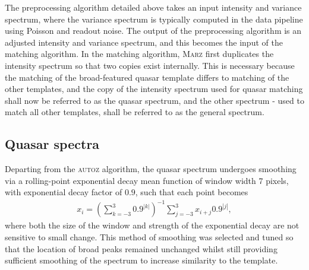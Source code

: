 \documentclass[iop]{emulateapj}
\newcommand{\autoz}{\textsc{autoz}}
\newcommand{\marz}{\textsc{Marz}}
\begin{document}
The preprocessing algorithm detailed above takes an input intensity and variance spectrum, where the variance spectrum is typically computed in the data pipeline using Poisson and readout noise. The output of the preprocessing algorithm is an adjusted intensity and variance spectrum, and this becomes the input of the matching algorithm. In the matching algorithm, \marz{} first duplicates the intensity spectrum so that two copies exist internally. This is necessary because the matching of the broad-featured quasar template differs to matching of the other templates, and the copy of the intensity spectrum used for quasar matching shall now be referred to as the quasar spectrum, and the other spectrum - used to match all other templates, shall be referred to as the general spectrum.\\

\subsection{Quasar spectra}

Departing from the \autoz{} algorithm, the quasar spectrum undergoes smoothing via a rolling-point exponential decay mean function of window width 7 pixels, with exponential decay factor of $0.9$, such that each point becomes
\begin{align}
x_i = \left( \sum_{k = -3}^3 0.9^{|k|}   \right)^{-1} \sum_{j = -3}^3 x_{i+j} 0.9^{|j|},
\end{align}
where both the size of the window and strength of the exponential decay are not sensitive to small change. This method of smoothing was selected and tuned so that the location of broad peaks remained unchanged whilst still providing sufficient smoothing of the spectrum to increase similarity to the template.\\
\end{document}
